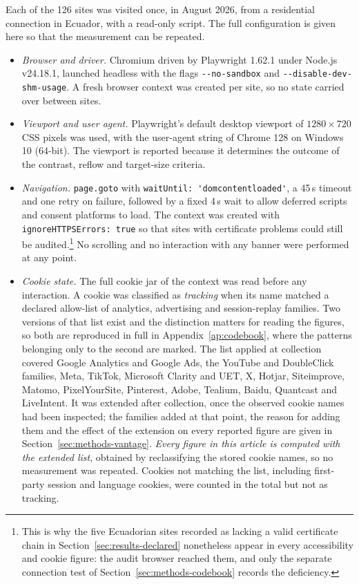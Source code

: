 \documentclass[pdflatex,sn-basic,Numbered,iicol]{sn-jnl}
\theoremstyle{thmstyleone}
\theoremstyle{thmstyletwo}
\theoremstyle{thmstylethree}
\begin{document}
Each of the 126 sites was visited once, in August 2026, from a residential connection in Ecuador, with a read-only script. The full configuration is given here so that the measurement can be repeated.

\begin{itemize}
	\item \emph{Browser and driver.} Chromium driven by Playwright 1.62.1 \citep{playwright2026} under Node.js v24.18.1, launched headless with the flags \verb|--no-sandbox| and \verb|--disable-dev-shm-usage|. A fresh browser context was created per site, so no state carried over between sites.
	\item \emph{Viewport and user agent.} Playwright's default desktop viewport of $1280 \times 720$ CSS pixels was used, with the user-agent string of Chrome 128 on Windows 10 (64-bit). The viewport is reported because it determines the outcome of the contrast, reflow and target-size criteria.
	\item \emph{Navigation.} \verb|page.goto| with \verb|waitUntil: 'domcontentloaded'|, a 45\,s timeout and one retry on failure, followed by a fixed 4\,s wait to allow deferred scripts and consent platforms to load. The context was created with \verb|ignoreHTTPSErrors: true| so that sites with certificate problems could still be audited.\footnote{This is why the five Ecuadorian sites recorded as lacking a valid certificate chain in Section~\ref{sec:results-declared} nonetheless appear in every accessibility and cookie figure: the audit browser reached them, and only the separate connection test of Section~\ref{sec:methods-codebook} records the deficiency.} No scrolling and no interaction with any banner were performed at any point.
	\item \emph{Cookie state.} The full cookie jar of the context was read before any interaction. A cookie was classified as \emph{tracking} when its name matched a declared allow-list of analytics, advertising and session-replay families. Two versions of that list exist and the distinction matters for reading the figures, so both are reproduced in full in Appendix~\ref{ap:codebook}, where the patterns belonging only to the second are marked. The list applied at collection covered Google Analytics and Google Ads, the YouTube and DoubleClick families, Meta, TikTok, Microsoft Clarity and UET, X, Hotjar, Siteimprove, Matomo, PixelYourSite, Pinterest, Adobe, Tealium, Baidu, Quantcast and LiveIntent. It was extended after collection, once the observed cookie names had been inspected; the families added at that point, the reason for adding them and the effect of the extension on every reported figure are given in Section~\ref{sec:methods-vantage}. \emph{Every figure in this article is computed with the extended list}, obtained by reclassifying the stored cookie names, so no measurement was repeated. Cookies not matching the list, including first-party session and language cookies, were counted in the total but not as tracking.

\end{itemize}
\end{document}

